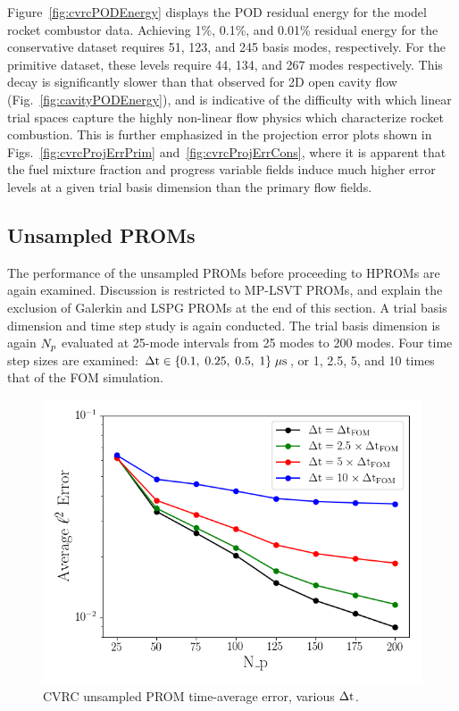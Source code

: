 Figure~\ref{fig:cvrcPODEnergy} displays the POD residual energy for the model rocket combustor data. Achieving 1\%, 0.1\%, and 0.01\% residual energy for the conservative dataset requires 51, 123, and 245 basis modes, respectively. For the primitive dataset, these levels require 44, 134, and 267 modes respectively. This decay is significantly slower than that observed for 2D open cavity flow (Fig.~\ref{fig:cavityPODEnergy}), and is indicative of the difficulty with which linear trial spaces capture the highly non-linear flow physics which characterize rocket combustion. This is further emphasized in the projection error plots shown in Figs.~\ref{fig:cvrcProjErrPrim} and~\ref{fig:cvrcProjErrCons}, where it is apparent that the fuel mixture fraction and progress variable fields induce much higher error levels at a given trial basis dimension than the primary flow fields.

\subsection{Unsampled PROMs}

The performance of the unsampled PROMs before proceeding to HPROMs are again examined. Discussion is restricted to MP-LSVT PROMs, and explain the exclusion of Galerkin and LSPG PROMs at the end of this section. A trial basis dimension and time step study is again conducted. The trial basis dimension is again $N_p$ evaluated at 25-mode intervals from 25 modes to 200 modes. Four time step sizes are examined: $\Delta \text{t} \in \{ 0.1, \; 0.25, \; 0.5, \; 1 \} \; \mu \text{s}$, or 1, 2.5, 5, and 10 times that of the FOM simulation.

\begin{figure}
	\centering
	\includegraphics[width=0.7\linewidth]{Chapters/HPROMResults/Images/cvrc/unsampled/unsampled_avg_mode_Average_errorRaw.png}
	\caption{\label{fig:cvrcUnsampledROMErrVsModes}CVRC unsampled PROM time-average error, various $\Delta \text{t}$.}
\end{figure}

